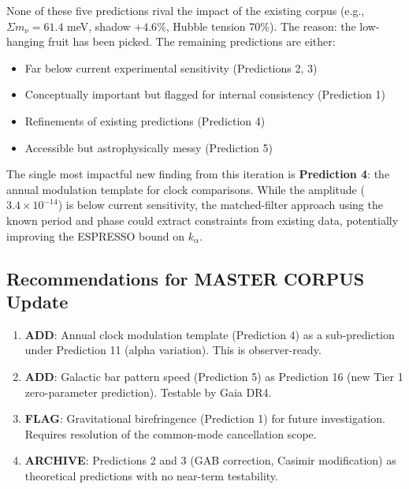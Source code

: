 \documentclass[11pt]{article}
\begin{document}
None of these five predictions rival the impact of the existing corpus (e.g.,
$\Sigma m_\nu = 61.4$ meV, shadow $+4.6\%$, Hubble tension 70\%). The reason:
the low-hanging fruit has been picked. The remaining predictions are either:
\begin{itemize}
\item Far below current experimental sensitivity (Predictions 2, 3)
\item Conceptually important but flagged for internal consistency (Prediction 1)
\item Refinements of existing predictions (Prediction 4)
\item Accessible but astrophysically messy (Prediction 5)
\end{itemize}

The single most impactful new finding from this iteration is \textbf{Prediction 4}:
the annual modulation template for clock comparisons. While the amplitude ($3.4 \times
10^{-14}$) is below current sensitivity, the matched-filter approach using the known
period and phase could extract constraints from existing data, potentially improving
the ESPRESSO bound on $k_\alpha$.

\subsection{Recommendations for MASTER CORPUS Update}

\begin{enumerate}
\item \textbf{ADD}: Annual clock modulation template (Prediction 4) as a sub-prediction
under Prediction 11 (alpha variation). This is observer-ready.
\item \textbf{ADD}: Galactic bar pattern speed (Prediction 5) as Prediction 16 (new
Tier 1 zero-parameter prediction). Testable by Gaia DR4.
\item \textbf{FLAG}: Gravitational birefringence (Prediction 1) for future investigation.
Requires resolution of the common-mode cancellation scope.
\item \textbf{ARCHIVE}: Predictions 2 and 3 (GAB correction, Casimir modification)
as theoretical predictions with no near-term testability.
\end{enumerate}
\end{document}
